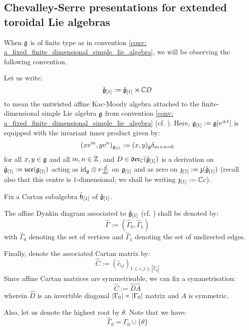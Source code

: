         \subsection{Chevalley-Serre presentations for extended toroidal Lie algebras}
            When $\mathfrak{g}$ is of finite type as in convention \ref{conv: a_fixed_finite_dimensional_simple_lie_algebra}, we will be observing the following convention.
            \begin{convention} \label{conv: a_fixed_untwisted_affine_kac_moody_algebra}
                Let us write:
                    $$\hat{\mathfrak{g}}_{[1]} := \tilde{\mathfrak{g}}_{[1]} \rtimes \mathbb{C} D$$
                to mean the untwisted affine Kac-Moody algebra attached to the finite-dimensional simple Lie algebra $\mathfrak{g}$ from convention \ref{conv: a_fixed_finite_dimensional_simple_lie_algebra} (cf. \cite[Chapter 7]{kac_infinite_dimensional_lie_algebras}). Here, $\mathfrak{g}_{[1]} := \mathfrak{g}[v^{\pm 1}]$ is equipped with the invariant inner product given by:
                    $$(x v^m, y v^n)_{\mathfrak{g}_{[1]}} := (x, y)_{\mathfrak{g}} \delta_{m + n = 0}$$
                for all $x, y \in \mathfrak{g}$ and all $m, n \in \mathbb{Z}$, and $D \in \mathfrak{der}_{\mathbb{C}}(\tilde{\mathfrak{g}}_{[1]})$ is a derivation on $\tilde{\mathfrak{g}}_{[1]} := \mathfrak{uce}(\mathfrak{g}_{[1]})$ acting as $\id_{\g} \tensor v \frac{d}{dv}$ on $\mathfrak{g}_{[1]}$ and as zero on $\mathfrak{z}_{[1]} := \mathfrak{z}(\tilde{\mathfrak{g}}_{[1]})$ (recall also that this centre is $1$-dimensional; we shall be writing $\mathfrak{z}_{[1]} := \mathbb{C} c$).
    
                Fix a Cartan subalgebra $\hat{\mathfrak{h}}_{[1]}$ of $\hat{\mathfrak{g}}_{[1]}$.
    
                The affine Dynkin diagram associated to $\hat{\mathfrak{g}}_{[1]}$ (cf. \cite[Chapter 4]{kac_infinite_dimensional_lie_algebras}) shall be denoted by:
                    $$\hat{\Gamma} := ( \hat{\Gamma}_0, \hat{\Gamma}_1 )$$
                with $\hat{\Gamma}_0$ denoting the set of vertices and $\hat{\Gamma}_1$ denoting the set of undirected edges.
    
                Finally, denote the associated Cartan matrix by:
                    $$\hat{C} := (\hat{c}_{ij})_{1 \leq i, j \leq |\hat{\Gamma}_0|}$$
                Since affine Cartan matrices are symmetrisable, we can fix a symmetrisation:
                    $$\hat{C} := \hat{D} \hat{A}$$
                wherein $\hat{D}$ is an invertible diagonal $|\Gamma_0| \x |\Gamma_0|$ matrix and $A$ is symmetric. 

                Also, let us denote the highest root by $\theta$. Note that we have:
                    $$\hat{\Gamma}_0 = \Gamma_0 \cup \{\theta\}$$
            \end{convention}
